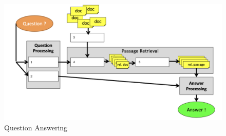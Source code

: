 \begin{figure}
  \center
  \includegraphics[width=.8\textwidth]{res/qa.png}
  \caption{Question Answering}\label{fig:qa}
\end{figure}